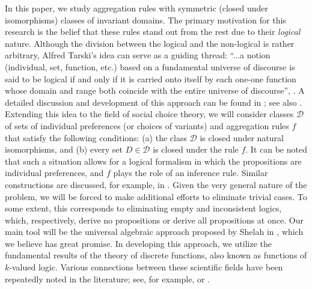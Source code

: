 \documentclass[graybox]{SNmult}
\theoremstyle{definition}
\begin{document}
In this paper, we study aggregation rules with symmetric (closed under isomorphisms) classes of invariant domains. The primary motivation for this research is the belief that these rules stand out from the rest due to their \textit{logical} nature. Although the division between the logical and the non-logical is rather arbitrary, Alfred Tarski's idea can serve as a guiding thread: ``...a notion (individual, set, function, etc.) based on a fundamental universe of discourse is said to be logical if and only if it is carried onto itself by each one-one function whose domain and range both coincide with the entire universe of discourse'', \cite{Tarski}. A detailed discussion and development of this approach can be found in \cite{Sher1,Sher2}; see also \cite{Dragalina}. Extending this idea to the field of social choice theory, we will consider classes $\mathscr D$ of sets of individual preferences (or choices of variants) and aggregation rules $f$ that satisfy the following conditions: (a) the class $\mathscr D$ is closed under natural isomorphisms, and (b) every set $D\in \mathscr D$ is closed under the rule $f$. It can be noted that such a situation allows for a logical formalism in which the propositions are individual preferences, and $f$ plays the role of an inference rule. Similar constructions are discussed, for example, in \cite{Endriss,Porello}. Given the very general nature of the problem, we will be forced to make additional efforts to eliminate trivial cases. To some extent, this corresponds to eliminating empty and inconsistent logics, which, respectively, derive no propositions or derive all propositions at once. Our main tool will be the universal algebraic approach proposed by Shelah in \cite{Shelah}, which we believe has great promise. In developing this approach, we utilize the fundamental results of the theory of discrete functions, also known as functions of $k$-valued logic. Various connections between these scientific fields have been repeatedly noted in the literature; see, for example, \cite{Murakami} or \cite{Ovchinnikov}.
\end{document}
